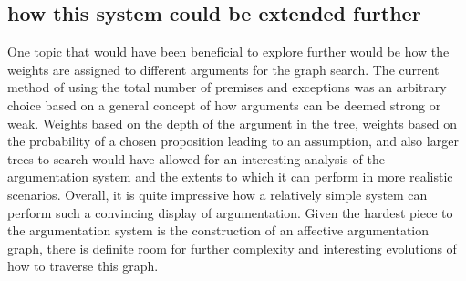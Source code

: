 \documentclass[10pt,a4paper,twocolumn]{article}
\begin{document}
\subsection{how this system could be extended further}
One topic that would have been beneficial to explore further would be how the weights
are assigned to different arguments for the graph search. The current method of
using the total number of premises and exceptions was an arbitrary choice based
on a general concept of how arguments can be deemed strong or weak. Weights
based on the depth of the argument in the tree, weights based on the probability of a chosen
proposition leading to an assumption, and also larger trees to search would have
allowed for an interesting analysis of the argumentation system and the extents
to which it can perform in more realistic scenarios. Overall, it is quite
impressive how a relatively simple system can perform such a convincing display
of argumentation. Given the hardest piece to the argumentation system is the
construction of an affective argumentation graph, there is definite room for
further complexity and interesting evolutions of how to traverse this graph.

%


\end{document}
